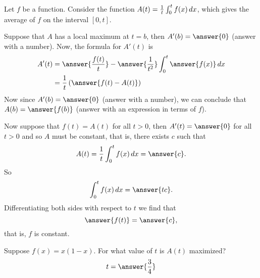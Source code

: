 \documentclass{ximera}
\author{Steven Gubkin}
\begin{document}
\begin{exercise}

Let $f$ be a function.  Consider the function $A(t) = \frac{1}{t} \int_0^t f(x)\mathop{}\!d x $, which gives the average of $f$ on the interval $[0,t]$.  

Suppose that $A$ has a local maximum at $t=b$, then $A'(b) = \answer{0}$ (answer with a number).  Now, the formula for $A'(t)$ is
\begin{align*}
A'(t) &= \answer{\frac{f(t)}{t}} - \answer{\frac{1}{t^2}}\int_0^t\answer{f(x)}\d x\\
&= \frac{1}{t}\left(\answer{f(t)-A(t)}\right)
\end{align*}
Now since $A'(b) = \answer{0}$ (answer with a number), we can conclude that $A(b) = \answer{f(b)}$ (answer with an expression in terms of $f$).

Now suppose that $f(t) = A(t)$ for all $t >0$, then $A'(t)=\answer{0}$ for all $t>0$ and so $A$ must be constant, that is, there exists $c$ such that
\[
A(t) = \frac{1}{t}\int_0^t f(x) \d x = \answer{c}.
\]
So
\[
\int_0^t f(x) \d x = \answer{tc}.
\]
Differentiating both sides with respect to $t$ we find that
\[
\answer{f(t)} = \answer{c},
\]
that is, $f$ is constant.

Suppose $f(x)  = x(1-x)$.  For what value of $t$ is $A(t)$ maximized?
\[
t = \answer{\frac{3}{4}}
\]

\end{exercise}
\end{document}
